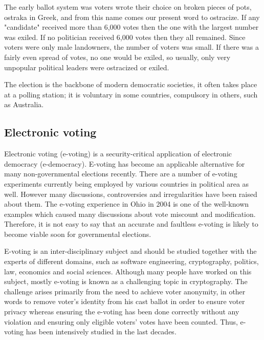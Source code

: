 The early ballot system was voters wrote their choice on broken pieces of pots, ostraka in Greek, and from this name comes our present word to ostracize. If any "candidate" received more than 6,000 votes then the one with the largest number was exiled. If no politician received 6,000 votes then they all remained. Since voters were only male landowners, the number of voters was small. If there was a fairly even spread of votes, no one would be exiled, so usually, only very unpopular political leaders were ostracized or exiled.\cite{mikehoganHistoryElectionsOnline}

The election is the backbone of modern democratic societies, it often takes place at a polling station; it is voluntary in some countries, compulsory in others, such as Australia\cite{australiangovernmentCOMMONWEALTHELECTORALACT}.

\subsection{Electronic voting}

Electronic voting (e-voting) is a security-critical application of electronic democracy (e-democracy). E-voting has become an applicable alternative for many non-governmental elections recently. There are a number of e-voting experiments currently being employed by various countries in political area as well. However many discussions, controversies and irregularities have been raised about them. The e-voting experience in Ohio in 2004 is one of the well-known examples which caused many discussions about vote miscount and modification. Therefore, it is not easy to say that an accurate and faultless e-voting is likely to become viable soon for governmental elections\cite{orhancetinkayaVerificationValidationIssues}.

E-voting is an inter-disciplinary subject and should be studied together with the experts of different domains, such as software engineering, cryptography, politics, law, economics and social sciences. Although many people have worked on this subject, mostly e-voting is known as a challenging topic in cryptography. The challenge arises primarily from the need to achieve voter anonymity, in other words to remove voter’s identity from his cast ballot in order to ensure voter privacy whereas ensuring the e-voting has been done correctly without any violation and ensuring only eligible voters’ votes have been counted. Thus, e-voting has been intensively studied in the last decades\cite{orhancetinkayaVerificationValidationIssues}.

